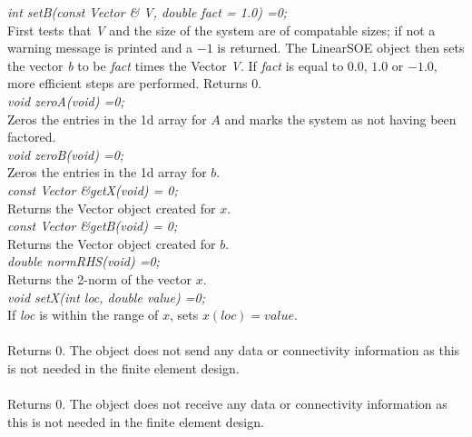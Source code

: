 {\em int setB(const Vector \& V, double fact = 1.0) =0;} \\
First tests that {\em V} and the size of the system are of compatable
sizes; if not a warning message is printed and a $-1$ is returned. The
LinearSOE object then sets the vector {\em b} to be {\em fact} times
the Vector {\em V}. If {\em fact} is equal to $0.0$, $1.0$ or $-1.0$,
more efficient steps are performed. Returns $0$. \\ 

{\em void zeroA(void) =0;} \\
Zeros the entries in the 1d array for $A$ and marks the system as not
having been factored. \\

{\em void zeroB(void) =0;} \\
Zeros the entries in the 1d array for $b$. \\

{\em const Vector \&getX(void) = 0;} \\
Returns the Vector object created for $x$. \\

{\em const Vector \&getB(void) = 0;} \\
Returns the Vector object created for $b$. \\

{\em double normRHS(void) =0;} \\
Returns the 2-norm of the vector $x$. \\

{\em void setX(int loc, double value) =0;}\\
If {\em loc} is within the range of $x$, sets $x(loc) = value$. \\

\\ 
Returns $0$. The object does not send any data or connectivity
information as this is not needed in the finite element design. \\

\\ 
Returns $0$. The object does not receive any data or connectivity
information as this is not needed in the finite element design.




